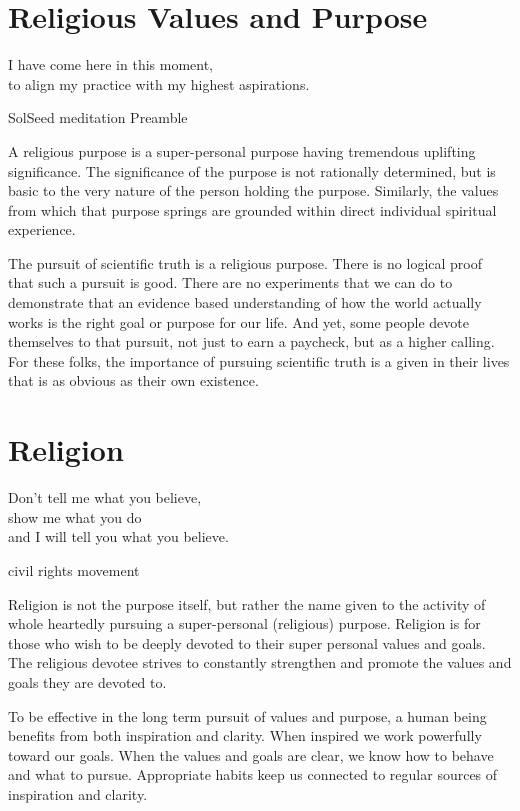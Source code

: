 \documentclass[ebook,12pt,openany,twoside]{memoir}
\begin{document}
\chapter{Religious Values and Purpose}

\setlength\epigraphwidth{3.3in}
\epigraph{
  I have come here in this moment,\\
  to align my practice with my highest aspirations.\\
}{SolSeed meditation Preamble}

A religious purpose is a super-personal purpose having tremendous uplifting
significance. The significance of the purpose is not rationally determined, but
is basic to the very nature of the person holding the purpose. Similarly, the
values from which that purpose springs are grounded within direct individual
spiritual experience.

The pursuit of scientific truth is a religious purpose. There is no logical
proof that such a pursuit is good. There are no experiments that we can do to
demonstrate that an evidence based understanding of how the world actually
works is the right goal or purpose for our life. And yet, some people devote
themselves to that pursuit, not just to earn a paycheck, but as a higher
calling. For these folks, the importance of pursuing scientific truth is a
given in their lives that is as obvious as their own existence.


\chapter{Religion}

\setlength\epigraphwidth{2.6in}
\epigraph{
  Don't tell me what you believe,\\
  show me what you do\\
  and I will tell you what you believe.
}{civil rights movement}


\noindent Religion is not the purpose itself, but rather the name given to the activity
of whole heartedly pursuing a super-personal (religious) purpose. Religion is
for those who wish to be deeply devoted to their super personal values and
goals. The religious devotee strives to constantly strengthen and promote the
values and goals they are devoted to.

To be effective in the long term pursuit of values and purpose, a human being
benefits from both inspiration and clarity. When inspired we work powerfully
toward our goals. When the values and goals are clear, we know how to behave
and what to pursue. Appropriate habits keep us connected to regular sources of
inspiration and clarity.
\end{document}
